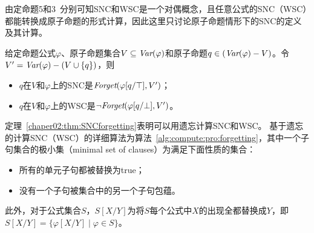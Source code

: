 由定命题5和3~\cite{DBLP:journals/ai/Lin01}分别可知SNC和WSC是一个对偶概念，且任意公式的SNC（WSC）都能转换成原子命题的形式计算，因此这里只讨论原子命题情形下的SNC的定义及其计算。

\begin{theorem}\label{chaper02:thm:SNCforgetting}
	给定命题公式$\varphi$、原子命题集合$V\subseteq \textit{Var}(\varphi)$和原子命题$q\in (\textit{Var}(\varphi)-V)$。令$V'= \textit{Var}(\varphi) - (V\cup \{q\})$，则
	\begin{itemize}
		\item $q$在$V$和$\varphi$上的SNC是$\textit{Forget}(\varphi[q/\top], V')$；
		\item $q$在$V$和$\varphi$上的WSC是$\neg \textit{Forget}(\varphi[q/\bot], V')$。
	\end{itemize}
\end{theorem}


定理~\ref{chaper02:thm:SNCforgetting}表明可以用遗忘计算SNC和WSC。
基于遗忘的计算SNC（WSC）的详细算法为算法~\ref{alg:compute:pro:forgetting}，其中一个子句集合的极小集（minimal set of clauses）为满足下面性质的集合：
\begin{itemize}
	\item 所有的单元子句都被替换为true；
	\item 没有一个子句被集合中的另一个子句包蕴。
\end{itemize}
此外，对于公式集合$S$，$S[X/Y]$为将$S$每个公式中$X$的出现全都替换成$Y$，即$S[X/Y]=\{\varphi[X/Y]\mid \varphi\in S\}$。

